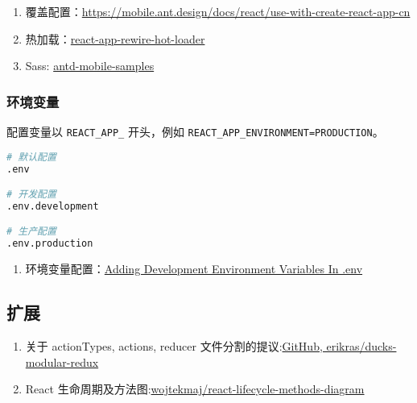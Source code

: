 \begin{enumerate}
\def\labelenumi{\arabic{enumi}.}
\tightlist
\item
  覆盖配置：\url{https://mobile.ant.design/docs/react/use-with-create-react-app-cn}
\item
  热加载：\href{https://github.com/cdharris/react-app-rewire-hot-loader}{react-app-rewire-hot-loader}
\item
  Sass:
  \href{https://github.com/ant-design/antd-mobile-samples/blob/master/create-react-app/config-overrides.js}{antd-mobile-samples}
\end{enumerate}

\subsubsection{环境变量}\label{ux73afux5883ux53d8ux91cf}

配置变量以 \lstinline!REACT_APP_! 开头，例如
\lstinline!REACT_APP_ENVIRONMENT=PRODUCTION!。

\begin{lstlisting}[language=bash]
# 默认配置
.env

# 开发配置
.env.development

# 生产配置
.env.production
\end{lstlisting}

\begin{enumerate}
\def\labelenumi{\arabic{enumi}.}
\tightlist
\item
  环境变量配置：\href{https://github.com/facebook/create-react-app/blob/master/packages/react-scripts/template/README.md\#adding-development-environment-variables-in-env}{Adding
  Development Environment Variables In .env}
\end{enumerate}

\subsection{扩展}\label{ux6269ux5c55}

\begin{enumerate}
\def\labelenumi{\arabic{enumi}.}
\tightlist
\item
  关于 actionTypes, actions, reducer
  文件分割的提议:\href{https://github.com/erikras/ducks-modular-redux}{GitHub,
  erikras/ducks-modular-redux}
\item
  React
  生命周期及方法图:\href{https://github.com/wojtekmaj/react-lifecycle-methods-diagram}{wojtekmaj/react-lifecycle-methods-diagram}
\end{enumerate}

